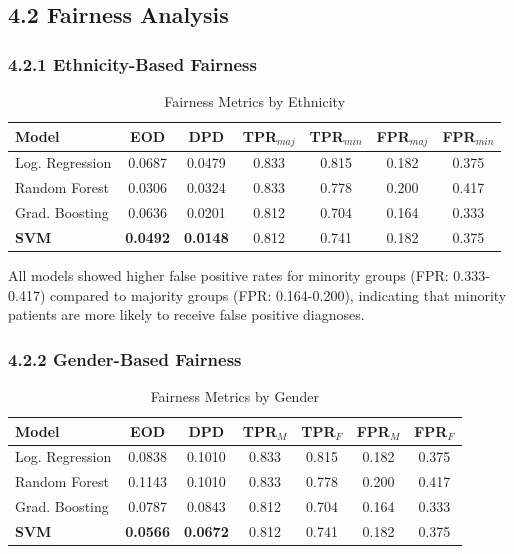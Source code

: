 \documentclass[12pt,a4paper]{article}
\begin{document}
\subsection{4.2 Fairness Analysis}

\subsubsection{4.2.1 Ethnicity-Based Fairness}

\begin{table}[H]
\centering
\caption{Fairness Metrics by Ethnicity}
\begin{tabular}{lcccccc}
\toprule
\textbf{Model} & \textbf{EOD} & \textbf{DPD} & \textbf{TPR$_{maj}$} & \textbf{TPR$_{min}$} & \textbf{FPR$_{maj}$} & \textbf{FPR$_{min}$} \\
\midrule
Log. Regression & 0.0687 & 0.0479 & 0.833 & 0.815 & 0.182 & 0.375 \\
Random Forest & 0.0306 & 0.0324 & 0.833 & 0.778 & 0.200 & 0.417 \\
Grad. Boosting & 0.0636 & 0.0201 & 0.812 & 0.704 & 0.164 & 0.333 \\
\textbf{SVM} & \textbf{0.0492} & \textbf{0.0148} & 0.812 & 0.741 & 0.182 & 0.375 \\
\bottomrule
\end{tabular}
\label{tab:ethnicity_fairness}
\end{table}

All models showed higher false positive rates for minority groups (FPR: 
0.333-0.417) compared to majority groups (FPR: 0.164-0.200), indicating 
that minority patients are more likely to receive false positive diagnoses.

\subsubsection{4.2.2 Gender-Based Fairness}

\begin{table}[H]
\centering
\caption{Fairness Metrics by Gender}
\begin{tabular}{lcccccc}
\toprule
\textbf{Model} & \textbf{EOD} & \textbf{DPD} & \textbf{TPR$_{M}$} & \textbf{TPR$_{F}$} & \textbf{FPR$_{M}$} & \textbf{FPR$_{F}$} \\
\midrule
Log. Regression & 0.0838 & 0.1010 & 0.833 & 0.815 & 0.182 & 0.375 \\
Random Forest & 0.1143 & 0.1010 & 0.833 & 0.778 & 0.200 & 0.417 \\
Grad. Boosting & 0.0787 & 0.0843 & 0.812 & 0.704 & 0.164 & 0.333 \\
\textbf{SVM} & \textbf{0.0566} & \textbf{0.0672} & 0.812 & 0.741 & 0.182 & 0.375 \\
\bottomrule
\end{tabular}
\label{tab:gender_fairness}
\end{table}
\end{document}

